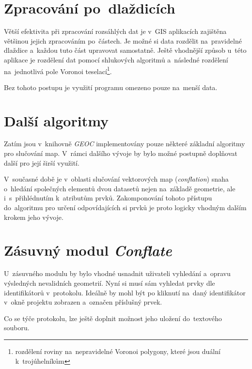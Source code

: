 







\section{Zpracování po~dlaždicích}
\label{dlazdice-vyvoj}

Větší efektivita při zpracování rozsáhlých dat je v~GIS aplikacích
zajištěna většinou jejich zpracováním po~částech. Je možné
si data rozdělit na~pravidelné dlaždice a~každou tuto část upravovat
samostatně. Ještě vhodnější způsob u~této aplikace je %
rozdělení dat pomocí shlukových algoritmů a~následné rozdělení
na~jednotlivá pole Voronoi teselací\footnote{rozdělení roviny 
na~nepravidelné Voronoi polygony, které jsou duální k~trojúhelníkům
}.

Bez tohoto postupu je využití programu omezeno pouze na~menší data.


\section{Další algoritmy}
\label{dalsi-vyvoj}

Zatím jsou v~knihovně \textit{GEOC} implementovány pouze některé
základní algoritmy pro slučování map. V~rámci dalšího vývoje by
bylo možné postupně doplňovat další pro její širší využití.

V~současné době je v~oblasti slučování vektorových map 
(\textit{conflation}) snaha o~hledání společných elementů 
dvou datasetů nejen na~základě geometrie, ale i~s~přihlédnutím
k~atributům prvků. Zakomponování tohoto přístupu do~algoritmu 
pro určení odpovídajících si prvků je proto logicky vhodným 
dalším krokem jeho vývoje.


\section{Zásuvný modul \textit{Conflate}}

U~zásuvného modulu by bylo vhodné usnadnit uživateli vyhledání
a~opravu výsledných nevalidních geometrií. Nyní si musí sám
vyhledat prvky dle identifikátorů v~protokolu. Ideálně by
mohl být po kliknutí na~daný identifikátor v~okně projektu zobrazen
a~označen příslušný prvek.

Co se týče protokolu, lze ještě doplnit možnost jeho uložení
do~textového souboru.

